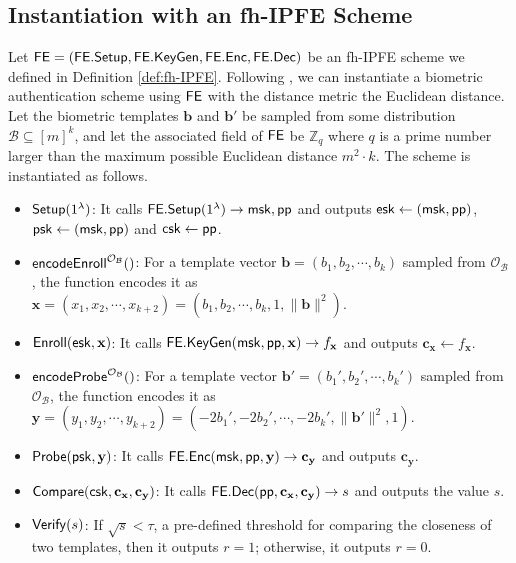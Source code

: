 \subsection{Instantiation with an fh-IPFE Scheme}
\label{sec:fh-IPFE-instantiation}

Let ${\sf FE} = ({\sf FE.Setup}, {\sf FE.KeyGen}, {\sf FE.Enc}, {\sf FE.Dec})$ be an fh-IPFE scheme we defined in Definition \ref{def:fh-IPFE}. Following \cite{cryptoeprint:2023/481}, we can instantiate a biometric authentication scheme using ${\sf FE}$ with the distance metric the Euclidean distance. Let the biometric templates $\mathbf{b}$ and $\mathbf{b'}$ be sampled from some distribution $\mathcal{B} \subseteq [m]^k$, and let the associated field of ${\sf FE}$ be $\mathbb{Z}_q$ where $q$ is a prime number larger than the maximum possible Euclidean distance $m^2 \cdot k$. The scheme is instantiated as follows.

\begin{itemize}

	\item ${\sf Setup}(1^\lambda)$: It calls ${\sf FE.Setup}(1^\lambda) \to {\sf msk}, {\sf pp}$ and outputs ${\sf esk} \gets ({\sf msk}, {\sf pp})$, ${\sf psk} \gets ({\sf msk}, {\sf pp})$ and ${\sf csk} \gets {\sf pp}$.

	\item ${\sf encodeEnroll}^{\mathcal{O}_{\mathcal{B}}}()$: For a template vector $\mathbf{b} = (b_1, b_2, \cdots, b_k)$ sampled from $\mathcal{O}_{\mathcal{B}}$, the function encodes it as $\mathbf{x} = (x_1, x_2, \cdots, x_{k+2}) = (b_1, b_2, \cdots, b_k, 1, \|\mathbf{b}\|^2)$. 

	\item ${\sf Enroll}({\sf esk}, \mathbf{x})$: It calls ${\sf FE.KeyGen}({\sf msk}, {\sf pp}, \mathbf{x}) \to f_\mathbf{x}$ and outputs $\mathbf{c_x} \gets f_\mathbf{x}$.

	\item ${\sf encodeProbe}^{\mathcal{O}_{\mathcal{B}}}()$: For a template vector $\mathbf{b'} = (b_1', b_2', \cdots, b_k')$ sampled from $\mathcal{O}_{\mathcal{B}}$, the function encodes it as $\mathbf{y} = (y_1, y_2, \cdots, y_{k+2}) = (-2b_1', -2b_2', \cdots, -2b_k', \|\mathbf{b'}\|^2, 1)$.

	\item ${\sf Probe}({\sf psk}, \mathbf{y})$: It calls ${\sf FE.Enc}({\sf msk}, {\sf pp}, \mathbf{y}) \to \mathbf{c_y}$ and outputs $\mathbf{c_y}$.

	\item ${\sf Compare}({\sf csk}, \mathbf{c_x}, \mathbf{c_y)}$: It calls ${\sf FE.Dec}({\sf pp}, \mathbf{c_x}, \mathbf{c_y}) \to s$ and outputs the value $s$.

	\item ${\sf Verify}(s)$: If $\sqrt{s} < \tau$, a pre-defined threshold for comparing the closeness of two templates, then it outputs $r = 1$; otherwise, it outputs $r = 0$.

\end{itemize}

